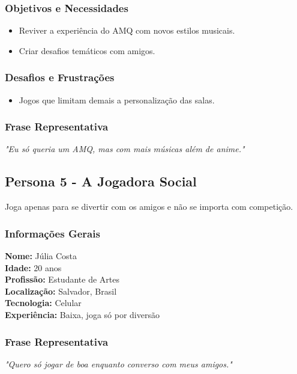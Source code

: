 \begin{titlepage}
    \subsubsection{Objetivos e Necessidades}
        \begin{itemize}
            \item Reviver a experiência do AMQ com novos estilos musicais.
            \item Criar desafios temáticos com amigos.
        \end{itemize}

    \subsubsection{Desafios e Frustrações}
        \begin{itemize}
            \item Jogos que limitam demais a personalização das salas.
        \end{itemize}
    
    \subsubsection{Frase Representativa}
        \textit{"Eu só queria um AMQ, mas com mais músicas além de anime."}

    \subsection{Persona 5 - A Jogadora Social}
    Joga apenas para se divertir com os amigos e não se importa com competição.

    \subsubsection{Informações Gerais}
        \textbf{Nome:} Júlia Costa\\
        \textbf{Idade:} 20 anos\\
        \textbf{Profissão:} Estudante de Artes\\
        \textbf{Localização:} Salvador, Brasil\\
        \textbf{Tecnologia:} Celular\\
        \textbf{Experiência:} Baixa, joga só por diversão\\
    
    \subsubsection{Frase Representativa}
        \textit{"Quero só jogar de boa enquanto converso com meus amigos."}

\end{titlepage}